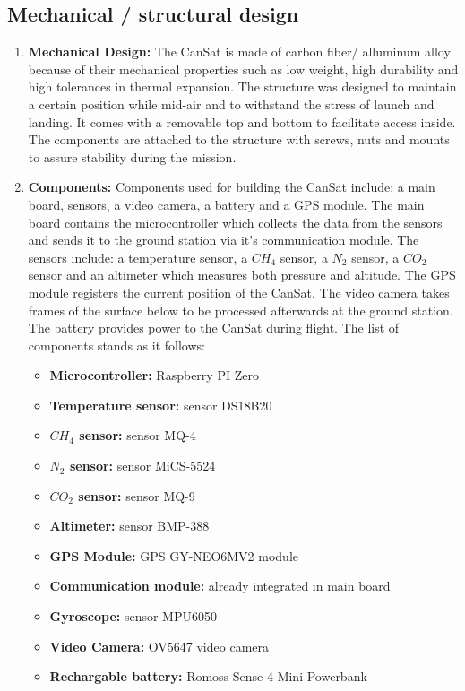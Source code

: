 \documentclass[11pt]{article}
\begin{document}
\subsection{Mechanical / structural design}
\begin{enumerate}
\item \textbf{Mechanical Design:} The CanSat is made of carbon fiber/ alluminum alloy because of their mechanical properties such as low weight, high durability and high tolerances in thermal expansion. The structure was designed to maintain a certain position while mid-air and to withstand the stress of launch and landing. It comes with a removable top and bottom to facilitate access inside. The components are attached to the structure with screws, nuts and mounts to assure stability during the mission.
\vspace{0.25cm}
\item \textbf{Components:} Components used for building the CanSat include: a main board, sensors, a video camera, a battery and a GPS module. The main board contains the microcontroller which collects the data from the sensors and sends it to the ground station via it’s communication module. The sensors include: a temperature sensor, a $CH_4$ sensor, a $N_2$ sensor, a $CO_2$ sensor and an altimeter which measures both pressure and altitude. The GPS module registers the current position of the CanSat. The video camera takes frames of the surface below to be processed afterwards at the ground station. The battery provides power to the CanSat during flight. The list of components stands as it follows:

\begin{itemize}
\item \textbf{Microcontroller:} Raspberry PI Zero
\item \textbf{Temperature sensor:} sensor DS18B20
\item \textbf{$CH_4$ sensor:} sensor MQ-4
\item \textbf{$N_2$ sensor:} sensor MiCS-5524
\item \textbf{$CO_2$ sensor:} sensor MQ-9
\item \textbf{Altimeter:} sensor BMP-388
\item \textbf{GPS Module:} GPS GY-NEO6MV2 module
\item \textbf{Communication module:} already integrated in main board
\item \textbf{Gyroscope:} sensor MPU6050
\item \textbf{Video Camera:} OV5647 video camera
\item \textbf{Rechargable battery:} Romoss Sense 4 Mini Powerbank
\end{itemize}


\end{enumerate}
\end{document}
